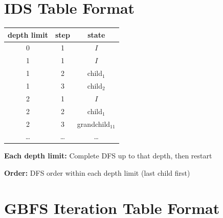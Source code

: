 \documentclass[11pt,a4paper]{article}
\begin{document}
\section{IDS Table Format}

\begin{definitionbox}
\begin{center}
\begin{tabular}{|c|c|c|}
\hline
\textbf{depth limit} & \textbf{step} & \textbf{state} \\
\hline
0 & 1 & $I$ \\
\hline
1 & 1 & $I$ \\
1 & 2 & child$_1$ \\
1 & 3 & child$_2$ \\
\hline
2 & 1 & $I$ \\
2 & 2 & child$_1$ \\
2 & 3 & grandchild$_{11}$ \\
\ldots & \ldots & \ldots \\
\hline
\end{tabular}
\end{center}

\textbf{Each depth limit:} Complete DFS up to that depth, then restart

\textbf{Order:} DFS order within each depth limit (last child first)
\end{definitionbox}

\section{GBFS Iteration Table Format}
\end{document}
